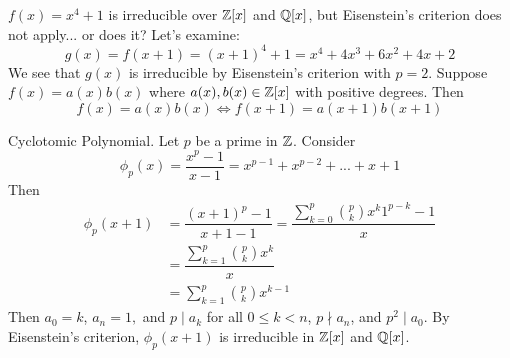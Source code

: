 \begin{example}
    $f(x) = x^4 + 1$ is irreducible over $\mathbb{Z}[x]$ and $\mathbb{Q}[x]$, but Eisenstein's criterion does not apply... or does it? Let's examine:
    $$g(x)= f(x+1) = (x+1)^4+1 = x^4+4x^3+6x^2+4x+2$$
    We see that $g(x)$ is irreducible by Eisenstein's criterion with $p = 2$. Suppose $f(x) = a(x)b(x)$ where $a(x), b(x) \in \mathbb{Z}[x]$ with positive degrees. Then
    $$f(x) = a(x)b(x) \iff f(x+1) = a(x+1)b(x+1)$$
\end{example}

\begin{example} Cyclotomic Polynomial.
    Let $p$ be a prime in $\mathbb{Z}$. Consider
    $$\phi_p(x) = \dfrac{x^p-1}{x-1} = x^{p-1}+x^{p-2}+...+x+1$$
    Then
    \begin{align*}
        \phi_p(x+1) &= \dfrac{(x+1)^p-1}{x+1-1} = \dfrac{\sum_{k=0}^{p}\binom{p}{k}x^k1^{p-k}-1}{x} \\
        &= \dfrac{\sum_{k=1}^{p}\binom{p}{k}x^k}{x} \\
        &= \sum_{k=1}^{p}\binom{p}{k}x^{k-1}
    \end{align*}
    Then $a_0 = k$, $a_n = 1,$ and $p\mid a_k$ for all $0 \leq k < n$, $p \nmid a_n$, and $p^2 \mid a_0$. By Eisenstein's criterion, $\phi_p(x+1)$ is irreducible in $\mathbb{Z}[x]$ and $\mathbb{Q}[x]$.
\end{example}
